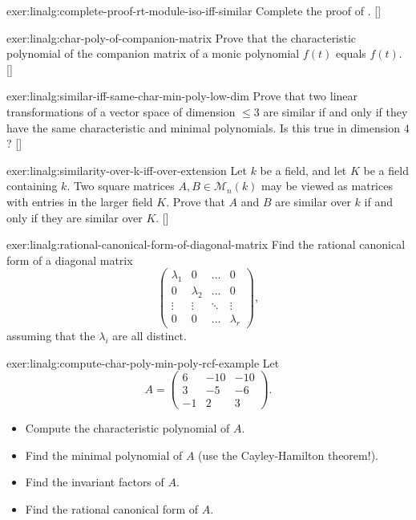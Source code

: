 \begin{exer}{\exerused}{exer:linalg:complete-proof-rt-module-iso-iff-similar}
  Complete the proof of . []
\end{exer}
\begin{exer}{\exerused}{exer:linalg:char-poly-of-companion-matrix}
  Prove that the characteristic polynomial of the companion matrix of
  a monic polynomial $f(t)$ equals $f(t)$. []
\end{exer}
\begin{exer}{\exerused}{exer:linalg:similar-iff-same-char-min-poly-low-dim}
  Prove that two linear transformations of a vector space of dimension
  $\leq 3$ are similar if and only if they have the same
  characteristic and minimal polynomials. Is this true in dimension
  $4$? []
\end{exer}
\begin{exer}{\exerused}{exer:linalg:similarity-over-k-iff-over-extension}
  Let $k$ be a field, and let $K$ be a field containing $k$. Two
  square matrices $A, B \in \mathcal{M}_n(k)$ may be viewed as
  matrices with entries in the larger field $K$. Prove that $A$ and
  $B$ are similar over $k$ if and only if they are similar over
  $K$. []
\end{exer}
\begin{exer}{}{exer:linalg:rational-canonical-form-of-diagonal-matrix}
  Find the rational canonical form of a diagonal matrix
  \[
    \begin{pmatrix}
      \lambda_1 & 0 & \dots & 0 \\
      0 & \lambda_2 & \dots & 0 \\
      \vdots & \vdots & \ddots & \vdots \\
      0 & 0 & \dots & \lambda_r
    \end{pmatrix},
  \]
  assuming that the $\lambda_i$ are all distinct.
\end{exer}
\begin{exer}{}{exer:linalg:compute-char-poly-min-poly-rcf-example}
  Let
  \[
    A = \begin{pmatrix} 6 & -10 & -10 \\ 3 & -5 & -6 \\ -1 & 2 & 3
    \end{pmatrix}.
  \]
  \begin{itemize}
  \item Compute the characteristic polynomial of $A$.
  \item Find the minimal polynomial of $A$ (use the Cayley-Hamilton
    theorem!).
  \item Find the invariant factors of $A$.
  \item Find the rational canonical form of $A$.
  \end{itemize}
\end{exer}
